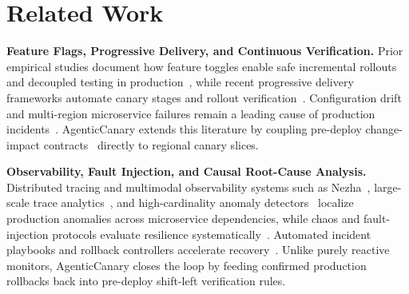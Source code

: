 \section{Related Work}
\label{sec:related}

\textbf{Feature Flags, Progressive Delivery, and Continuous Verification.}
Prior empirical studies document how feature toggles enable safe incremental rollouts and decoupled testing in production~\cite{mahdavihezaveh2021software,mahdavihezaveh2022feature}, while recent progressive delivery frameworks automate canary stages and rollout verification~\cite{palvai2026developing,bates2021software,weing2018powered}. Configuration drift and multi-region microservice failures remain a leading cause of production incidents~\cite{laigner2026empirical,jayalath2024microservice}. AgenticCanary extends this literature by coupling pre-deploy change-impact contracts~\cite{chen2021cipc,chen2023microservice} directly to regional canary slices.

\textbf{Observability, Fault Injection, and Causal Root-Cause Analysis.}
Distributed tracing and multimodal observability systems such as Nezha~\cite{yu2023nezha}, large-scale trace analytics~\cite{peng2022large}, and high-cardinality anomaly detectors~\cite{shi2026conceptual} localize production anomalies across microservice dependencies, while chaos and fault-injection protocols evaluate resilience systematically~\cite{nelavala2026protocol,gunawat2025driven}. Automated incident playbooks and rollback controllers accelerate recovery~\cite{sikha2023playbook,sirikonda2026reducing}. Unlike purely reactive monitors, AgenticCanary closes the loop by feeding confirmed production rollbacks back into pre-deploy shift-left verification rules.

